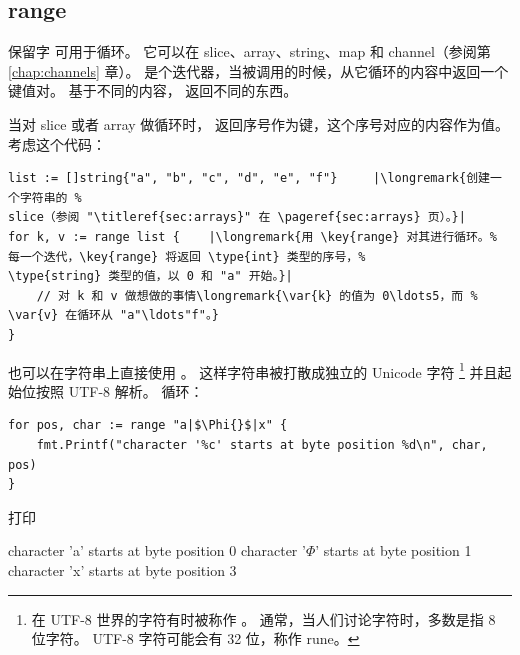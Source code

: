 \subsection{range}
保留字  可用于循环。
它可以在 slice、array、string、map 和 channel（参阅第 \ref{chap:channels} 章）。
 是个迭代器，当被调用的时候，从它循环的内容中返回一个键值对。
基于不同的内容， 返回不同的东西。

当对 slice 或者 array 做循环时， 返回序号作为键，这个序号对应的内容作为值。
考虑这个代码：
\begin{lstlisting}
list := []string{"a", "b", "c", "d", "e", "f"}     |\longremark{创建一个字符串的 %
slice（参阅 "\titleref{sec:arrays}" 在 \pageref{sec:arrays} 页）。}|
for k, v := range list {	|\longremark{用 \key{range} 对其进行循环。%
每一个迭代，\key{range} 将返回 \type{int} 类型的序号，%
\type{string} 类型的值，以 0 和 "a" 开始。}|
    // 对 k 和 v 做想做的事情\longremark{\var{k} 的值为 0\ldots5，而 %
\var{v} 在循环从 "a"\ldots"f"。}
}
\end{lstlisting}
\showremarks

也可以在字符串上直接使用 。
这样字符串被打散成独立的 Unicode 字符
\footnote{在 UTF-8 世界的字符有时被称作 。
通常，当人们讨论字符时，多数是指 8 位字符。
UTF-8 字符可能会有 32 位，称作 rune。}
并且起始位按照 UTF-8 解析。
循环：
\begin{lstlisting}
for pos, char := range "a|$\Phi{}$|x" {
    fmt.Printf("character '%c' starts at byte position %d\n", char, pos)
}
\end{lstlisting}
打印
\begin{display}
character 'a' starts at byte position 0
character '\begin{math}\Phi\end{math}' starts at byte position 1
character 'x' starts at byte position 3 
\end{display}

